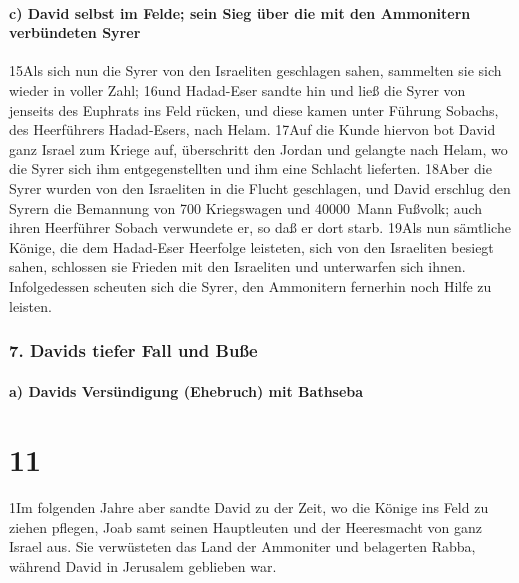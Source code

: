 \hypertarget{c-david-selbst-im-felde-sein-sieg-uxfcber-die-mit-den-ammonitern-verbuxfcndeten-syrer}{%
\paragraph{c) David selbst im Felde; sein Sieg über die mit den
Ammonitern verbündeten
Syrer}\label{c-david-selbst-im-felde-sein-sieg-uxfcber-die-mit-den-ammonitern-verbuxfcndeten-syrer}}

15Als sich nun die Syrer von den Israeliten geschlagen sahen, sammelten
sie sich wieder in voller Zahl; 16und Hadad-Eser sandte hin und ließ die
Syrer von jenseits des Euphrats ins Feld rücken, und diese kamen unter
Führung Sobachs, des Heerführers Hadad-Esers, nach Helam. 17Auf die
Kunde hiervon bot David ganz Israel zum Kriege auf, überschritt den
Jordan und gelangte nach Helam, wo die Syrer sich ihm entgegenstellten
und ihm eine Schlacht lieferten. 18Aber die Syrer wurden von den
Israeliten in die Flucht geschlagen, und David erschlug den Syrern die
Bemannung von 700 Kriegswagen und 40000~Mann Fußvolk; auch ihren
Heerführer Sobach verwundete er, so daß er dort starb. 19Als nun
sämtliche Könige, die dem Hadad-Eser Heerfolge leisteten, sich von den
Israeliten besiegt sahen, schlossen sie Frieden mit den Israeliten und
unterwarfen sich ihnen. Infolgedessen scheuten sich die Syrer, den
Ammonitern fernerhin noch Hilfe zu leisten.

\hypertarget{davids-tiefer-fall-und-buuxdfe}{%
\subsubsection{7. Davids tiefer Fall und
Buße}\label{davids-tiefer-fall-und-buuxdfe}}

\hypertarget{a-davids-versuxfcndigung-ehebruch-mit-bathseba}{%
\paragraph{a) Davids Versündigung (Ehebruch) mit
Bathseba}\label{a-davids-versuxfcndigung-ehebruch-mit-bathseba}}

\hypertarget{section-10}{%
\section{11}\label{section-10}}

1Im folgenden Jahre aber sandte David zu der Zeit, wo die Könige ins
Feld zu ziehen pflegen, Joab samt seinen Hauptleuten und der Heeresmacht
von ganz Israel aus. Sie verwüsteten das Land der Ammoniter und
belagerten Rabba, während David in Jerusalem geblieben war.

